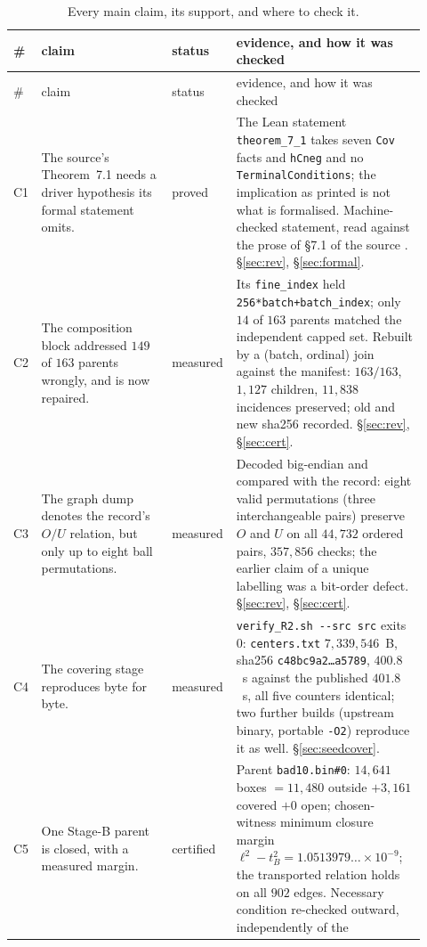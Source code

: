 \documentclass[10pt]{article}
\theoremstyle{definition}
\newcommand{\file}[1]{\texttt{\small #1}}
\newcommand{\status}[1]{\textsf{\small #1}}
\begin{document}
{\small
\begin{longtable}{@{}L{0.045\linewidth}L{0.315\linewidth}L{0.105\linewidth}L{0.455\linewidth}@{}}
\caption{Every main claim, its support, and where to check it.}\label{tab:claims}\\
\toprule
\# & claim & status & evidence, and how it was checked \\
\midrule
\endfirsthead
\toprule
\# & claim & status & evidence, and how it was checked \\
\midrule
\endhead
C1 & The source's Theorem~7.1 needs a driver hypothesis its formal statement omits. &
\status{proved} &
The Lean statement \file{theorem\_7\_1} takes seven \texttt{Cov} facts and \texttt{hCneg} and no
\texttt{TerminalConditions}; the implication as printed is not what is formalised. Machine-checked
statement, read against the prose of \S7.1 of the source \cite{ope26}. \S\ref{sec:rev}, \S\ref{sec:formal}. \\
C2 & The composition block addressed $149$ of $163$ parents wrongly, and is now repaired. &
\status{measured} &
Its \file{fine\_index} held \texttt{256*batch+batch\_index}; only $14$ of $163$ parents matched the
independent capped set. Rebuilt by a (batch, ordinal) join against the manifest: $163/163$,
$1{,}127$ children, $11{,}838$ incidences preserved; old and new sha256 recorded. \S\ref{sec:rev}, \S\ref{sec:cert}. \\
C3 & The graph dump denotes the record's $O/U$ relation, but only up to eight ball permutations. &
\status{measured} &
Decoded big-endian and compared with the record: eight valid permutations (three interchangeable
pairs) preserve $O$ and $U$ on all $44{,}732$ ordered pairs, $357{,}856$ checks; the earlier claim of
a unique labelling was a bit-order defect. \S\ref{sec:rev}, \S\ref{sec:cert}. \\
C4 & The covering stage reproduces byte for byte. &
\status{measured} &
\file{verify\_R2.sh -{}-src src} exits $0$: \file{centers.txt} $7{,}339{,}546$~B, sha256
\texttt{c48bc9a2\ldots a5789}, $400.8$~s against the published $401.8$~s, all five counters identical;
two further builds (upstream binary, portable \texttt{-O2}) reproduce it as well. \S\ref{sec:seedcover}. \\
C5 & One Stage-B parent is closed, with a measured margin. &
\status{certified} &
Parent \file{bad10.bin\#0}: $14{,}641$ boxes $=11{,}480$ outside $+3{,}161$ covered $+0$ open;
chosen-witness minimum closure margin $\ell^2-t_B^2=1.0513979\ldots\times10^{-9}$; the transported
relation holds on all $902$ edges. Necessary condition re-checked outward, independently of the

\end{longtable}}
\end{document}

